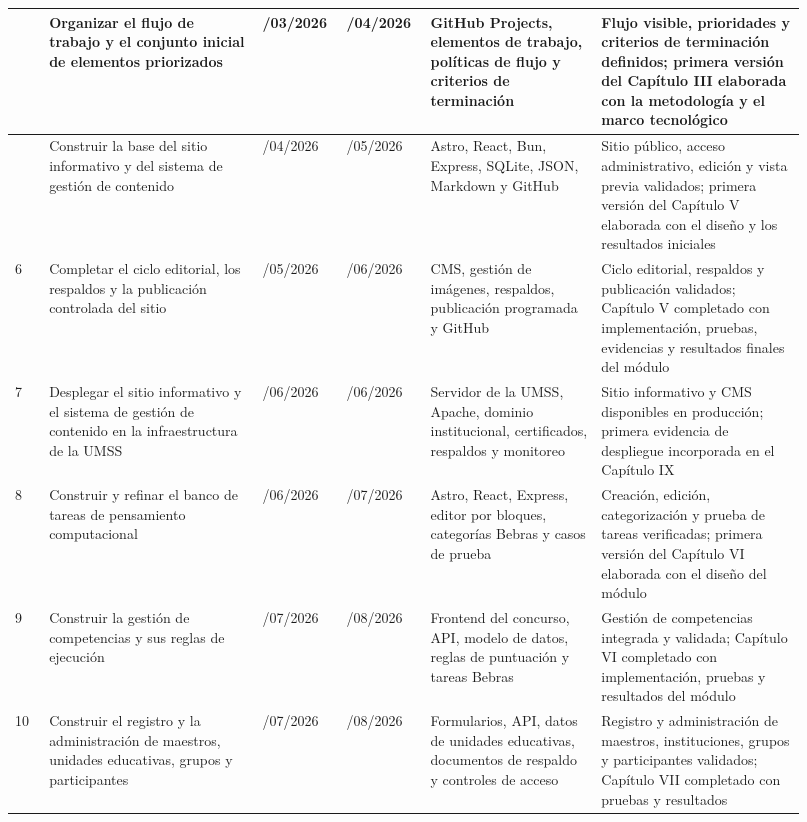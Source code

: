 \documentclass[12pt,letterpaper]{article}
\begin{document}
\begin{landscape}
\begin{longtable}{|>{\centering\arraybackslash}p{0.045\linewidth}|p{0.25\linewidth}|>{\centering\arraybackslash}p{0.09\linewidth}|>{\centering\arraybackslash}p{0.09\linewidth}|p{0.20\linewidth}|p{0.245\linewidth}|}
4 & Organizar el flujo de trabajo y el conjunto inicial de elementos priorizados & 23/03/2026 & 05/04/2026 & GitHub Projects, elementos de trabajo, políticas de flujo y criterios de terminación & Flujo visible, prioridades y criterios de terminación definidos; primera versión del Capítulo III elaborada con la metodología y el marco tecnológico \\ \hline

5 & Construir la base del sitio informativo y del sistema de gestión de contenido & 06/04/2026 & 10/05/2026 & Astro, React, Bun, Express, SQLite, JSON, Markdown y GitHub & Sitio público, acceso administrativo, edición y vista previa validados; primera versión del Capítulo V elaborada con el diseño y los resultados iniciales \\ \hline

6 & Completar el ciclo editorial, los respaldos y la publicación controlada del sitio & 11/05/2026 & 14/06/2026 & CMS, gestión de imágenes, respaldos, publicación programada y GitHub & Ciclo editorial, respaldos y publicación validados; Capítulo V completado con implementación, pruebas, evidencias y resultados finales del módulo \\ \hline

7 & Desplegar el sitio informativo y el sistema de gestión de contenido en la infraestructura de la UMSS & 15/06/2026 & 28/06/2026 & Servidor de la UMSS, Apache, dominio institucional, certificados, respaldos y monitoreo & Sitio informativo y CMS disponibles en producción; primera evidencia de despliegue incorporada en el Capítulo IX \\ \hline

8 & Construir y refinar el banco de tareas de pensamiento computacional & 29/06/2026 & 19/07/2026 & Astro, React, Express, editor por bloques, categorías Bebras y casos de prueba & Creación, edición, categorización y prueba de tareas verificadas; primera versión del Capítulo VI elaborada con el diseño del módulo \\ \hline

9 & Construir la gestión de competencias y sus reglas de ejecución & 13/07/2026 & 02/08/2026 & Frontend del concurso, API, modelo de datos, reglas de puntuación y tareas Bebras & Gestión de competencias integrada y validada; Capítulo VI completado con implementación, pruebas y resultados del módulo \\ \hline

10 & Construir el registro y la administración de maestros, unidades educativas, grupos y participantes & 27/07/2026 & 16/08/2026 & Formularios, API, datos de unidades educativas, documentos de respaldo y controles de acceso & Registro y administración de maestros, instituciones, grupos y participantes validados; Capítulo VII completado con pruebas y resultados \\ \hline


\end{longtable}
\end{landscape}
\end{document}
